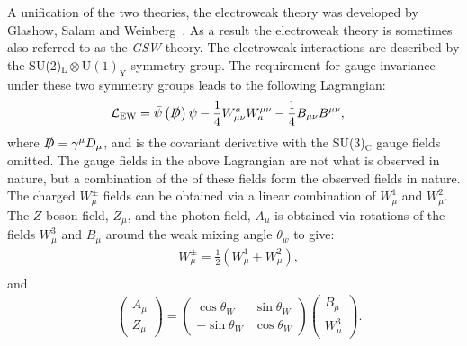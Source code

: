 A unification of the two theories, the electroweak theory was developed by Glashow, Salam and Weinberg~\cite{Glashow1959,Salam1959,Weinberg1967}. As a result the electroweak theory is sometimes also referred to as the \emph{GSW} theory. The electroweak interactions are described by the SU(2)$_\mathrm{L}\otimes\mathrm{U(1)}_\mathrm{Y}$ symmetry group. The requirement for gauge invariance under these two symmetry groups leads to the following Lagrangian:
\begin{equation}
    \label{eq:lagrangianEW}
    \begin{aligned}
        & \mathcal{L}_\mathrm{EW} = \bar{\psi}\left(\slashed{D}\right)\psi - \frac{1}{4}W^a_{\mu\nu}W_a^{\mu\nu} - \frac{1}{4}B_{\mu\nu}B^{\mu\nu},
     \end{aligned}
\end{equation}
where $\slashed{D} = \gamma^\mu D_\mu$, and is the covariant derivative with the SU(3)$_\mathrm{C}$ gauge fields omitted. The gauge fields in the above Lagrangian are not what is observed in nature, but a combination of the of these fields form the observed fields in nature. The charged $W^\pm_\mu$ fields can be obtained via a linear combination of $W^1_\mu$ and $W^2_\mu$. The $Z$ boson field, $Z_\mu$, and the photon field, $A_\mu$ is obtained via rotations of the fields $W_\mu^3$ and $B_\mu$ around the weak mixing angle $\theta_w$ to give:
\begin{equation}\renewcommand*{\arraystretch}{\newarraystrech}
    \label{eq:wbosonFields}
    \begin{aligned}
        & W^\pm_\mu = \frac{1}{2} \left(W^1_\mu + W^2_\mu \right), \\
     \end{aligned}
\end{equation}
and 
\begin{equation}\renewcommand*{\arraystretch}{\newarraystrech}
    \label{eq:zbosonFields}
    \begin{aligned}
        & \begin{pmatrix}
            A_\mu \\
            Z_\mu
        \end{pmatrix} = \begin{pmatrix}
            \cos \theta_W & \sin \theta_W \\
            -\sin \theta_W & \cos \theta_W
        \end{pmatrix} \begin{pmatrix}
            B_\mu \\
            W_\mu^3
        \end{pmatrix}.
     \end{aligned}
\end{equation}
